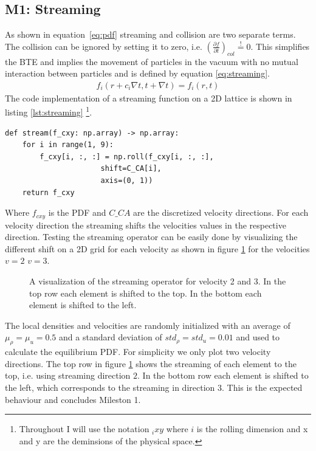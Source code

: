 \documentclass[a4paper,11pt]{article}
\begin{document}
\subsection{M1: Streaming}
As shown in equation~\ref{eq:pdf} streaming and collision are two separate terms.
The collision can be ignored by setting it to zero, i.e. $\left( \frac{\partial f}{\partial t} \right)_{col} \overset{!}{=} 0$.
This simplifies the BTE and implies the movement of particles in the vacuum with no mutual interaction between particles and is defined by equation \ref{eq:streaming}.
\begin{equation}
  \label{eq:streaming}
  \begin{aligned}
    f_{i}(r+c_{i} \nabla t,t+\nabla t)=f_{i}(r,t)
  \end{aligned}
\end{equation}
The code implementation of a streaming function on a 2D lattice is shown in listing \ref{lst:streaming}
\footnote{Throughout I will use the notation $_ixy$ where $i$ is the rolling dimension and x and y are the deminsions of the physical space.}.
\begin{center}
\begin{lstlisting}[caption=Implementation of the streaming operator,label=lst:streaming, basicstyle=\small]
def stream(f_cxy: np.array) -> np.array:
    for i in range(1, 9):
        f_cxy[i, :, :] = np.roll(f_cxy[i, :, :], 
                      shift=C_CA[i], 
                      axis=(0, 1))
    return f_cxy
  \end{lstlisting}
\end{center}
Where $f_{cxy}$ is the PDF and $C \_ CA$ are the discretized velocity directions.
For each velocity direction the streaming shifts the velocities values in the respective direction.
Testing the streaming operator can be easily done by visualizing the different shift on a 2D grid for each velocity as shown in figure \ref{fig:m1-shifting} for the velocities $v=2$ $v=3$.
\begin{figure}[ht]
\centering
\resizebox{\columnwidth}{!}{\large}
\vspace*{-10mm}
\caption[Visualization of the streaming]{A visualization of the streaming operator for velocity 2 and 3. In the top row each element is shifted to the top. In the bottom  each element is shifted to the left.}
\label{fig:m1-shifting}
\end{figure}
The local densities and velocities are randomly initialized with an average of $\mu_{\rho}=\mu_{u}=0.5$ and a standard deviation of $std_{\rho}=std_{u}=0.01$ and used to calculate the equilibrium PDF.
For simplicity we only plot two velocity directions.
The top row in figure \ref{fig:m1-shifting} shows the streaming of each element to the top, i.e. using streaming direction $2$. In the bottom row each element is shifted to the left, which corresponds to the streaming in direction $3$.
This is the expected behaviour and concludes Mileston 1.
\end{document}
